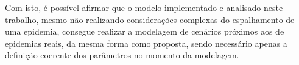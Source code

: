 \documentclass[a4paper,12pt]{article}
\begin{document}
Com isto, é possível afirmar que o modelo implementado e analisado neste trabalho, mesmo não realizando considerações complexas do espalhamento de uma epidemia, consegue realizar a modelagem de cenários próximos aos de epidemias reais, da mesma forma como proposta, sendo necessário apenas a definição coerente dos parâmetros no momento da modelagem.

\newpage


\end{document}
